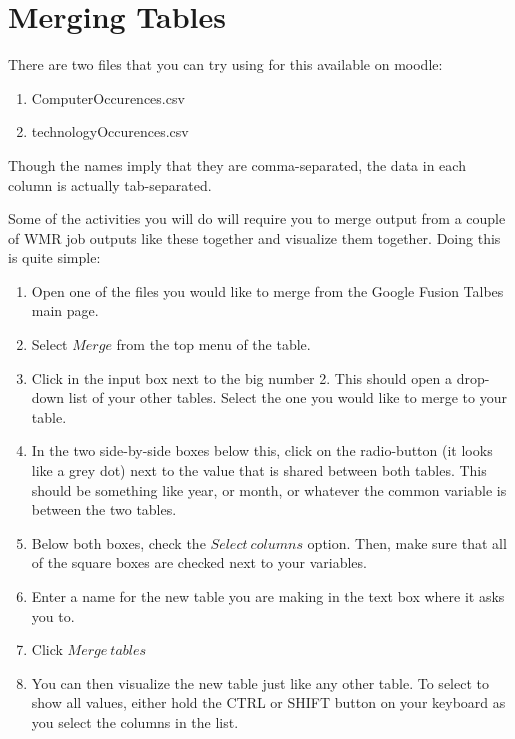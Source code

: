 \documentclass[letterpaper,10pt,openany,oneside]{sphinxmanual}
\begin{document}
\section{Merging Tables}
\label{WmrActivities/WmrActivities:merging-tables}
There are two files that you can try using for this available on
moodle:
\begin{enumerate}
\item {} 
ComputerOccurences.csv

\item {} 
technologyOccurences.csv

\end{enumerate}

Though the names imply that they are comma-separated, the data in
each column is actually tab-separated.

Some of the activities you will do will require you to merge output
from a couple of WMR job outputs like these together and visualize
them together. Doing this is quite simple:
\begin{enumerate}
\item {} 
Open one of the files you would like to merge from the Google
Fusion Talbes main page.

\item {} 
Select $Merge$ from the top menu of the table.

\item {} 
Click in the input box next to the big number 2. This should
open a drop-down list of your other tables. Select the one you
would like to merge to your table.

\item {} 
In the two side-by-side boxes below this, click on the
radio-button (it looks like a grey dot) next to the value that is
shared between both tables. This should be something like year, or
month, or whatever the common variable is between the two tables.

\item {} 
Below both boxes, check the $Select\ columns$ option.
Then, make sure that all of the square boxes are checked next to
your variables.

\item {} 
Enter a name for the new table you are making in the text box
where it asks you to.

\item {} 
Click $Merge\ tables$

\item {} 
You can then visualize the new table just like any other table.
To select to show all values, either hold the CTRL or SHIFT button
on your keyboard as you select the columns in the list.

\end{enumerate}



\renewcommand{\indexname}{Index}
\printindex
\end{document}
